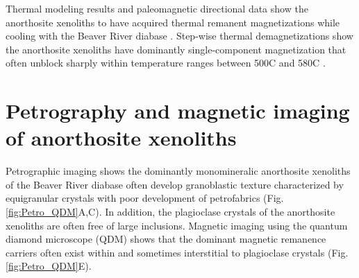 \documentclass[9pt,twocolumn,twoside,lineno]{pnas-new}
\begin{document}

Thermal modeling results and paleomagnetic directional data show the anorthosite xenoliths to have acquired thermal remanent magnetizations while cooling with the Beaver River diabase \cite{Zhang2021b}. Step-wise thermal demagnetizations show the anorthosite xenoliths have dominantly single-component magnetization that often unblock sharply within temperature ranges between 500\textdegree C and 580\textdegree C \cite{Zhang2021b}. 

\section*{Petrography and magnetic imaging of anorthosite xenoliths}

Petrographic imaging shows the dominantly monomineralic anorthosite xenoliths of the Beaver River diabase often develop granoblastic texture characterized by equigranular crystals with poor development of petrofabrics (Fig. \ref{fig:Petro_QDM}A,C). In addition, the plagioclase crystals of the anorthosite xenoliths are often free of large inclusions. Magnetic imaging using the quantum diamond microscope (QDM) shows that the dominant magnetic remanence carriers often exist within and sometimes interstitial to plagioclase crystals (Fig. \ref{fig:Petro_QDM}E). 
\end{document}

